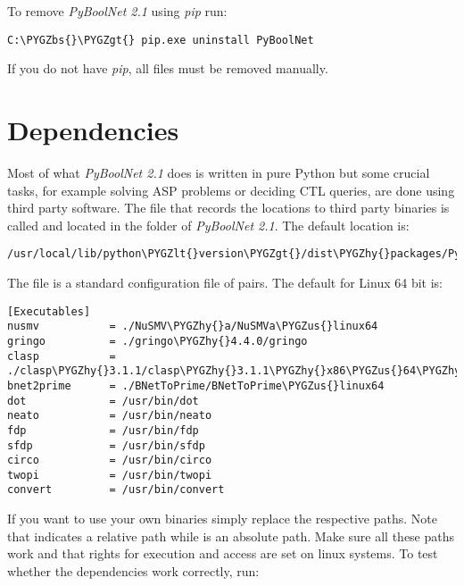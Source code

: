 \documentclass[letterpaper,10pt,english]{sphinxmanual}
\def\PYGZbs{\char`\\}
\def\PYGZus{\char`\_}
\def\PYGZlt{\char`\<}
\def\PYGZgt{\char`\>}
\def\PYGZhy{\char`\-}
\begin{document}
To remove \emph{PyBoolNet 2.1} using \emph{pip} run:

\begin{Verbatim}[commandchars=\\\{\}]
C:\PYGZbs{}\PYGZgt{} pip.exe uninstall PyBoolNet
\end{Verbatim}

If you do not have \emph{pip}, all files must be removed manually.


\section{Dependencies}
\label{Installation:dependencies}
Most of what \emph{PyBoolNet 2.1} does is written in pure Python but some crucial tasks, for example solving ASP problems or deciding CTL queries, are done using third party software.
The file that records the locations to third party binaries is called  and located in the folder  of \emph{PyBoolNet 2.1}.
The default location is:

\begin{Verbatim}[commandchars=\\\{\}]
/usr/local/lib/python\PYGZlt{}version\PYGZgt{}/dist\PYGZhy{}packages/PyBoolNet/Dependencies/settings.cfg
\end{Verbatim}

The file is a standard configuration file of  pairs. The default for Linux 64 bit is:

\begin{Verbatim}[commandchars=\\\{\}]
[Executables]
nusmv           = ./NuSMV\PYGZhy{}a/NuSMVa\PYGZus{}linux64
gringo          = ./gringo\PYGZhy{}4.4.0/gringo
clasp           = ./clasp\PYGZhy{}3.1.1/clasp\PYGZhy{}3.1.1\PYGZhy{}x86\PYGZus{}64\PYGZhy{}linux
bnet2prime      = ./BNetToPrime/BNetToPrime\PYGZus{}linux64
dot             = /usr/bin/dot
neato           = /usr/bin/neato
fdp             = /usr/bin/fdp
sfdp            = /usr/bin/sfdp
circo           = /usr/bin/circo
twopi           = /usr/bin/twopi
convert         = /usr/bin/convert
\end{Verbatim}

If you want to use your own binaries simply replace the respective paths. Note that  indicates a relative path while \code{/} is an absolute path.
Make sure all these paths work and that rights for execution and access are set on linux systems.
To test whether the dependencies work correctly, run:
\end{document}
